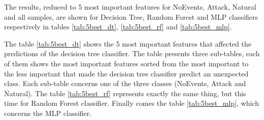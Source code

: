 The results, reduced to 5 most important features for NoEvents, Attack, Natural and all samples, are shown for Decision Tree, Random Forest and MLP classifiers respectively in tables \ref{tab:5best_dt}, \ref{tab:5best_rf} and \ref{tab:5best_mlp}.

The table \ref{tab:5best_dt} shows the 5 most important features that affected the predictions of the decision tree classifier. The table presents three sub-tables, each of them shows the most important features sorted from the most important to the less important that made the decision tree classifier predict an unexpected class. Each sub-table concerns one of the three classes (NoEvents, Attack and Natural). The table \ref{tab:5best_rf} represents exactly the same thing, but this time for Random Forest classifier. Finally comes the table \ref{tab:5best_mlp}, which concerns the MLP classifier.  


